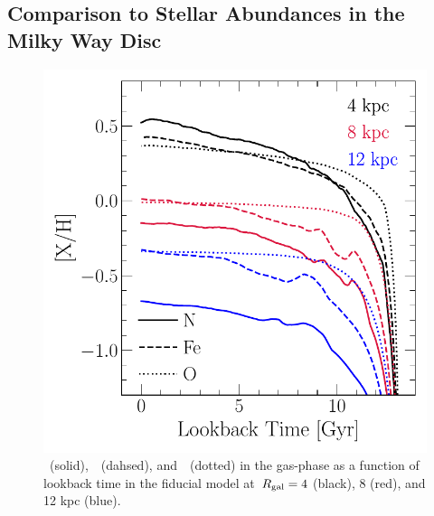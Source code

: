 \documentclass[ms.tex]{subfiles}
\begin{document}
\subsection{Comparison to Stellar Abundances in the Milky Way Disc}
\label{sec:results:vincenzo_comp}

\begin{figure}
\centering
\includegraphics[scale = 0.63]{nh_feh_vs_lookback.pdf}
\caption{
\nh~(solid),~\feh~(dahsed), and~\oh~(dotted) in the gas-phase as a function of
lookback time in the fiducial model at~$R_\text{gal} = 4$ (black), 8 (red), and 12 kpc
(blue).
}
\label{fig:nh_feh_vs_lookback}
\end{figure}
\end{document}
